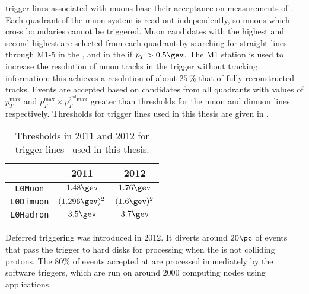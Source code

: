 \lone trigger lines associated with muons base their acceptance on measurements of \pt.
Each quadrant of the muon system is read out independently, so muons which cross boundaries cannot
be triggered.
Muon candidates with the highest and second highest \pt are selected from each quadrant by
searching for straight lines through M1-5 in the , and in the  if
$p_T>0.5\gev$.
The M1 station is used to increase the \pt resolution of muon tracks in the trigger without
tracking information: this achieves a resolution of about $25\,\%$ that of fully reconstructed
tracks.
Events are accepted based on candidates from all quadrants with values of $p_T^\mathrm{max}$ and
$p_T^\mathrm{max}\times p_T^\mathrm{2^{nd} max}$ greater than thresholds for the muon and dimuon
lines respectively.
Thresholds for \lone trigger lines used in this thesis are given in .

\begin{table}
  \caption[Level one trigger threholds]
  {
    Thresholds in 2011 and 2012 for \lone trigger lines~\cite{Albrecht:2013fba} used in this thesis.
  }
  \label{tab:lhcb:trigger}
  \begin{center}
    \begin{tabular}{ccc}\toprule
      &2011&2012\\\midrule
      {\tt L0Muon} & $1.48\gev$ & $1.76\gev$ \\
      {\tt L0Dimuon} & $(1.296\gev)^2$ & $(1.6\gev)^2$ \\
      {\tt L0Hadron} & $3.5\gev$ & $3.7\gev$ \\
      \bottomrule
    \end{tabular}
  \end{center}
\end{table}

Deferred triggering was introduced in 2012.
It diverts around $20\pc$ of events that pass the \lone trigger to hard disks for processing when
the \lhc is not colliding protons.
The $80\%$ of events accepted at are processed immediately by the software triggers, which are run
on around 2000 computing nodes using \cpp applications.

